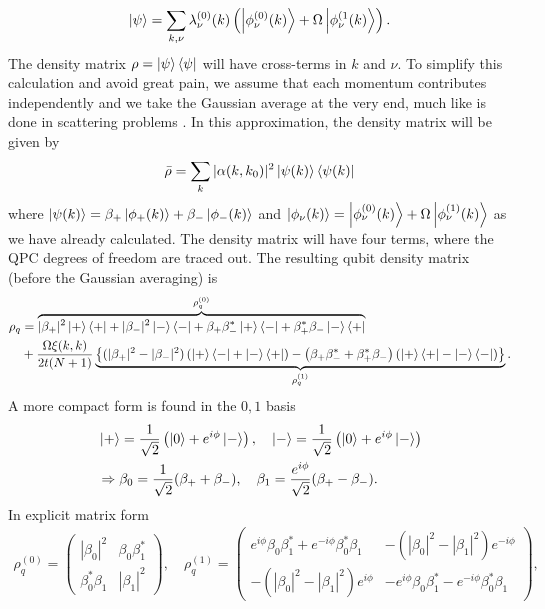 \documentclass{article}
\begin{document}
\begin{align}
    \ket{\psi} =  \sum_{k,\nu} \lambda^{(0)}_\nu (k)\left( \ket{\phi_\nu^{(0)}(k)} + \Omega \ket{\phi_\nu^{(1}(k)} \right).
\end{align}
The density matrix $\rho = \ket{\psi}\bra{\psi}$ will have cross-terms in $k$ and $\nu$. To simplify this calculation and avoid great pain, we assume that each momentum contributes independently and we take the Gaussian average at the very end, much like is done in scattering problems \cite{shankarQuantumMechanics1994}. In this approximation, the density matrix will be given by
\begin{align}
    \bar{\rho} = \sum_k |\alpha(k,k_0)|^2 \ket{\psi(k)}\bra{\psi(k)}
\end{align}
where $\ket{\psi(k)} = \beta_{+}\ket{\phi_{+}(k)}+\beta_{-}\ket{\phi_{-}(k)}$ and $\ket{\phi_{\nu}(k)} = \ket{\phi^{(0)}_{\nu}(k)}+ \Omega\ket{\phi^{(1)}_{\nu}(k)}$ as we have already calculated. The density matrix will have four terms, where the QPC degrees of freedom are traced out. The resulting qubit density matrix (before the Gaussian averaging) is 
\begin{align}
\rho_q & = \overbrace{|\beta_+|^2 \ket{+}\bra{+} + |\beta_-|^2\ket{-}\bra{-} + \beta_{+}\beta_{-}^* \ket{+}\bra{-} + \beta_{+}^*\beta_{-}\ket{-}\bra{+}}^{\rho_{q}^{(0)}}\nonumber \\
& + \frac{\Omega \xi(k,k)}{2t(N+1)}\underbrace{\left\{ ( |\beta_+|^2 - |\beta_{-}|^2 ) \left( \ket{+}\bra{-} + \ket{-}\bra{+}\right) - \left( \beta_{+}\beta_{-}^* +  \beta_{+}^*\beta_{-} \right)  \left( \ket{+}\bra{+} -  \ket{-}\bra{-}  \right)    \right\}}_{\rho^{(1)}_q}.
\end{align}
A more compact form is found in the $0,1$ basis
 \begin{align}
    & \ket{+} = \frac{1}{\sqrt{2}}\left(\ket{0} +  e^{i\phi}\ket{-}\right), \quad \ket{-} = \frac{1}{\sqrt{2}}\left(\ket{0} +  e^{i\phi}\ket{-}\right)\\
    & \Rightarrow \beta_0 = \frac{1}{\sqrt{2}}( \beta_+ + \beta_{-}), \quad \beta_1 = \frac{e^{i\phi}}{\sqrt{2}}( \beta_+ - \beta_{-}).
 \end{align}
In explicit matrix form
 \begin{align}
    \rho_q^{(0)} = \begin{pmatrix}
        |\beta_0|^2 & \beta_0\beta_1^* \\
        \beta_0^*\beta_1 &  |\beta_1|^2
    \end{pmatrix}, \quad  
    \rho_q^{(1)} = \begin{pmatrix}
        e^{i\phi} \beta_0\beta_1^* + e^{-i\phi} \beta_0^*\beta_1 & - (|\beta_0|^2 - |\beta_1|^2)e^{-i\phi} \\
        - (|\beta_0|^2 - |\beta_1|^2)e^{i\phi} &  - e^{i\phi} \beta_0\beta_1^* - e^{-i\phi} \beta_0^*\beta_1
    \end{pmatrix},
 \end{align}
\end{document}
